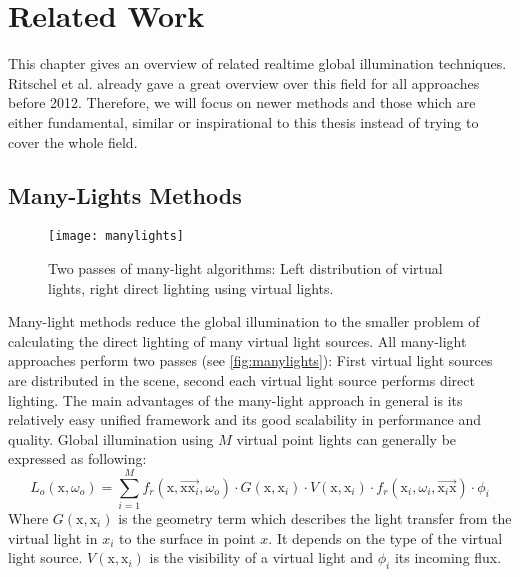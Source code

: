 \documentclass[thesis.tex]{subfiles}
\begin{document}
\chapter{Related Work}
\label{chap:prevwork}


This chapter gives an overview of related realtime global illumination techniques.
Ritschel et al. \cite{bib:RealtimeGIOverview} already gave a great overview over this field for all approaches before 2012.
Therefore, we will focus on newer methods and those which are either fundamental, similar or inspirational to this thesis instead of trying to cover the whole field.

\section {Many-Lights Methods}
\begin{figure}[h]
	\centering
	\texttt{[image: manylights]}
	\caption{\cite{bib:manylightssurvey2014} Two passes of many-light algorithms: Left distribution of virtual lights, right direct lighting using virtual lights.} \label{fig:manylights}
\end{figure}
Many-light methods reduce the global illumination to the smaller problem of calculating the direct lighting of many virtual light sources.
All many-light approaches perform two passes (see \autoref{fig:manylights}):
First virtual light sources are distributed in the scene, second each virtual light source performs direct lighting.
The main advantages of the many-light approach in general is its relatively easy unified framework and its good scalability in performance and quality.
Global illumination using $M$ virtual point lights can generally be expressed as following:
\begin{equation}
L_o(\mathrm{x}, \omega_o) = \sum\limits_{i=1}^{M} f_r(\mathrm{x}, \overrightarrow{\mathrm{x}\mathrm{x}_i}, \omega_o) \cdot G(\mathrm{x}, \mathrm{x}_i) \cdot V(\mathrm{x}, \mathrm{x}_i) \cdot f_r(\mathrm{x}_i, \omega_i, \overrightarrow{\mathrm{x}_i\mathrm{x}}) \cdot \phi_i
\end{equation}
Where $G(\mathrm{x}, \mathrm{x}_i)$ is the geometry term which describes the light transfer from the virtual light in $x_i$ to the surface in point $x$.
It depends on the type of the virtual light source.
$V(\mathrm{x}, \mathrm{x}_i)$ is the visibility of a virtual light and $\phi_i$ its incoming flux.
\end{document}
